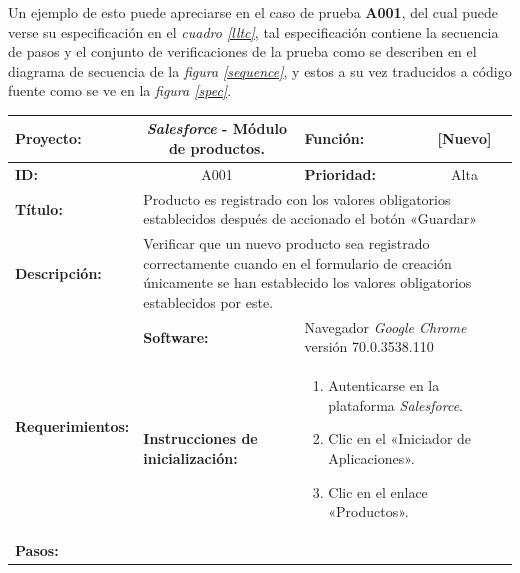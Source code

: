 Un ejemplo de esto puede apreciarse en el caso de prueba \textbf{A001}, del cual
puede verse su especificación en el \emph{cuadro \ref{lltc}}, tal especificación
contiene la secuencia de pasos y el conjunto de verificaciones de la prueba como
se describen en el diagrama de secuencia de la \emph{figura \ref{sequence}}, y
estos a su vez traducidos a código fuente como se ve en la
\emph{figura \ref{spec}}.

\begin{table}
\renewcommand{\arraystretch}{1}
\linespread{1}
\centering
\begin{tabular}{|p{2.5cm}|p{2.8cm}|p{2.2cm}|p{2.8cm}|p{2.2cm}|}
\hline
\footnotesize{\textbf{Proyecto:}} &
\multicolumn{2}{c|}{\footnotesize{\emph{Salesforce} - Módulo de productos.}} &
\footnotesize{\textbf{Función:}} &
\multicolumn{1}{c|}{\footnotesize{[Nuevo]}} \\
\hline
\footnotesize{\textbf{ID:}} & \multicolumn{2}{c|}{\footnotesize{A001}} &
\footnotesize{\textbf{Prioridad:}} &
\multicolumn{1}{c|}{\footnotesize{Alta}} \\
\hline
\footnotesize{\textbf{Título:}} &
\multicolumn{4}{p{12.4cm}|}{\footnotesize{Producto es registrado con los valores
obligatorios establecidos después de accionado el botón «Guardar»}} \\
\hline
\footnotesize{\textbf{Descripción:}} &
\multicolumn{4}{p{12.4cm}|}{\footnotesize{Verificar que un nuevo producto sea
registrado correctamente cuando en el formulario de creación únicamente se han
establecido los valores obligatorios establecidos por este.}} \\
\hline
\multirow{2}{*}{\footnotesize{\textbf{Requerimientos:}}} &
\footnotesize{\textbf{Software:}} &
\multicolumn{3}{p{7.8cm}|}{\footnotesize{Navegador \emph{Google Chrome}
versión 70.0.3538.110}} \\
\cline{2-5}
& \footnotesize{\textbf{Instrucciones de inicialización:}} &
\multicolumn{3}{p{7.8cm}|}{\footnotesize{
\vspace{-3mm}
\begin{enumerate}
\item Autenticarse en la plataforma \emph{Salesforce}.
\item Clic en el «Iniciador de Aplicaciones».
\item Clic en el enlace «Productos».
\end{enumerate}
\vspace{-5mm}
}} \\
\hline
\footnotesize{\textbf{Pasos:}} &
\multicolumn{4}{p{11.8cm}|}{\footnotesize{
}}
\end{tabular}
\end{table}
